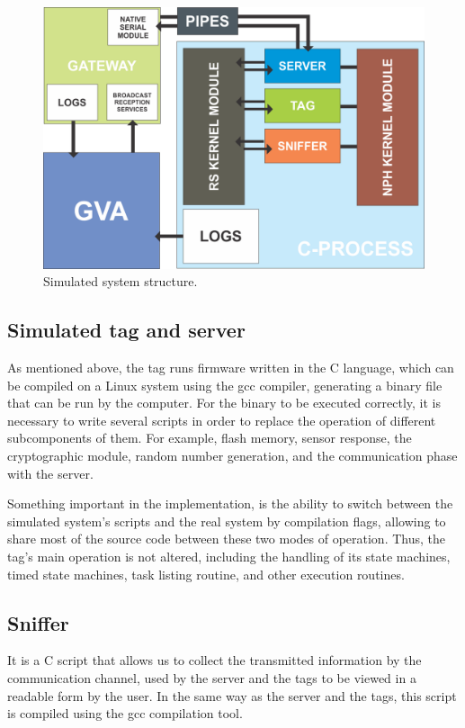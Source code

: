 \documentclass[journal]{IEEEtran}	%
\begin{document}
\begin{figure}[t!]
\centering
\includegraphics[width=0.95\columnwidth]{SIMULATED-SYSTEM.png}
\caption{Simulated system structure.}
\label{fig:simulated-system}
\end{figure}


\subsection{Simulated tag and server}


As mentioned above, the tag runs firmware written in the C language, which can be compiled on a Linux system using the gcc compiler, generating a binary file that can be run by the computer. For the binary to be executed correctly, it is necessary to write several scripts in order to replace the operation of different subcomponents of them. For example, flash memory, sensor response, the cryptographic module, random number generation, and the communication phase with the server.

Something important in the implementation, is the ability to switch between the simulated system's scripts and the real system by compilation flags, allowing to share most of the source code between these two modes of operation. Thus, the tag's main operation is not altered, including the handling of its state machines, timed state machines, task listing routine, and other execution routines.


\subsection{Sniffer}


It is a C script that allows us to collect the transmitted information by the communication channel, used by the server and the tags to be viewed in a readable form by the user. In the same way as the server and the tags, this script is compiled using the gcc compilation tool.
\end{document}
